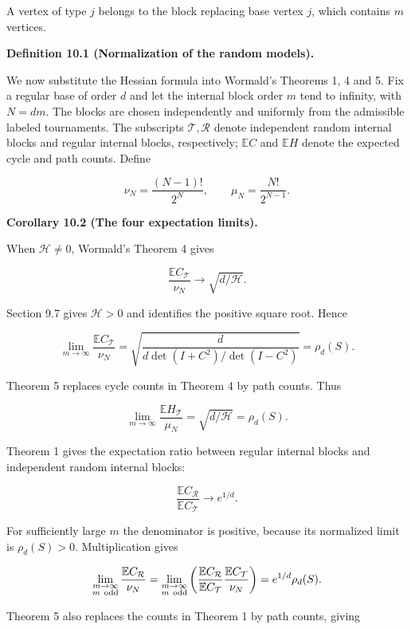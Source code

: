 \documentclass[11pt,a4paper]{article}
\begin{document}
A vertex of type \(j\) belongs to the block replacing base vertex \(j\), which contains \(m\) vertices.

\textbf{Definition 10.1 (Normalization of the random models).}

We now substitute the Hessian formula into Wormald's Theorems 1, 4 and 5. Fix a regular base of order \(d\) and let the internal block order \(m\) tend to infinity, with \(N=dm\). The blocks are chosen independently and uniformly from the admissible labeled tournaments. The subscripts \(\mathcal T,\mathcal R\) denote independent random internal blocks and regular internal blocks, respectively; \(\mathbb EC\) and \(\mathbb EH\) denote the expected cycle and path counts. Define

\[
\nu_N=\frac{(N-1)!}{2^N},\qquad
\mu_N=\frac{N!}{2^{N-1}}.
\]

\textbf{Corollary 10.2 (The four expectation limits).}

When \(\mathcal H\ne0\), Wormald's Theorem 4 gives

\[
\frac{\mathbb EC_{\mathcal T}}{\nu_N}
\longrightarrow\sqrt{d/\mathcal H}.
\]

Section 9.7 gives \(\mathcal H>0\) and identifies the positive square root. Hence

\[
\lim_{m\to\infty}\frac{\mathbb EC_{\mathcal T}}{\nu_N}
=\sqrt{\frac d{d\det(I+C^2)/\det(I-C^2)}}
=\rho_d(S).
\]

Theorem 5 replaces cycle counts in Theorem 4 by path counts. Thus

\[
\lim_{m\to\infty}\frac{\mathbb EH_{\mathcal T}}{\mu_N}
=\sqrt{d/\mathcal H}=\rho_d(S).
\]

Theorem 1 gives the expectation ratio between regular internal blocks and independent random internal blocks:

\[
\frac{\mathbb EC_{\mathcal R}}{\mathbb EC_{\mathcal T}}
\longrightarrow e^{1/d}.
\]

For sufficiently large \(m\) the denominator is positive, because its normalized limit is \(\rho_d(S)>0\). Multiplication gives

\[
\lim_{\substack{m\to\infty\\m\ {\rm odd}}}
\frac{\mathbb EC_{\mathcal R}}{\nu_N}
=\lim_{\substack{m\to\infty\\m\ {\rm odd}}}
\left(\frac{\mathbb EC_{\mathcal R}}{\mathbb EC_{\mathcal T}}
\frac{\mathbb EC_{\mathcal T}}{\nu_N}\right)
=e^{1/d}\rho_d(S).
\]

Theorem 5 also replaces the counts in Theorem 1 by path counts, giving
\end{document}
